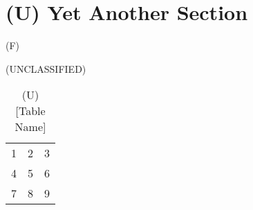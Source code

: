 \section{(U) Yet Another Section}

(F) \lipsum[1]

\begin{table}
\begin{smarkenv}[\textwidth]{(UNCLASSIFIED)}
\begin{center}
\begin{tabular}{ l c r }
  1 & 2 & 3 \\
  4 & 5 & 6 \\
  7 & 8 & 9 \\
\end{tabular}
\end{center}
\end{smarkenv}
\caption{(U) [Table Name]}
\end{table}
